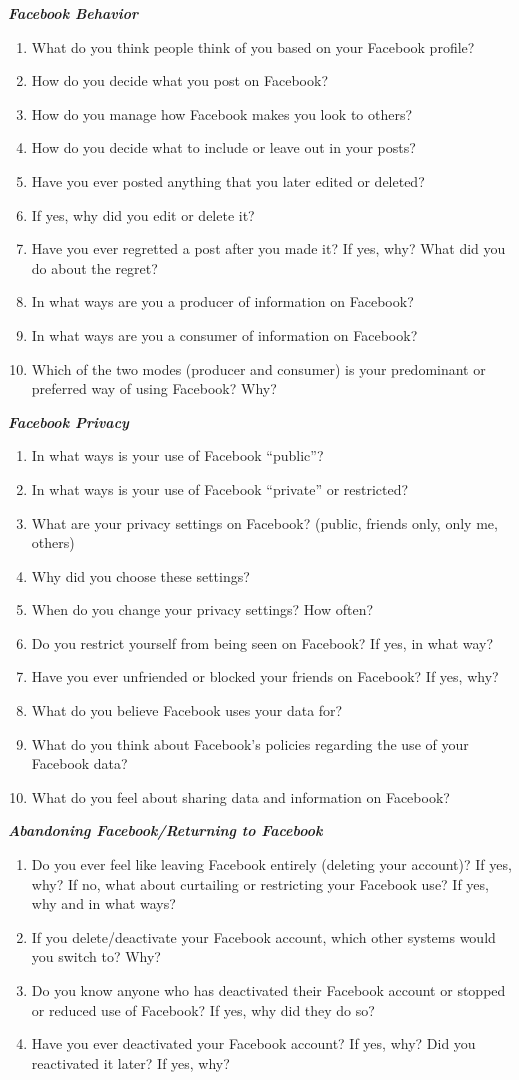 \textbf{\textit{Facebook Behavior}}
\begin{enumerate}
\item What do you think people think of you based on your Facebook profile?
\item How do you decide what you post on Facebook?
\item How do you manage how Facebook makes you look to others?
\item How do you decide what to include or leave out in your posts?
\item Have you ever posted anything that you later edited or deleted?
\item If yes, why did you edit or delete it?
\item Have you ever regretted a post after you made it? If yes, why? What did you do about the regret?
\item In what ways are you a producer of information on Facebook?
\item In what ways are you a consumer of information on Facebook?
\item Which of the two modes (producer and consumer) is your predominant or preferred way of using Facebook? Why? 
\end{enumerate}
\textbf{\textit{Facebook Privacy}}
\begin{enumerate}
\item In what ways is your use of Facebook “public”?
\item In what ways is your use of Facebook “private” or restricted?
\item What are your privacy settings on Facebook? (public, friends only, only me, others)
\item Why did you choose these settings?
\item When do you change your privacy settings? How often?
\item Do you restrict yourself from being seen on Facebook? If yes, in what way?
\item Have you ever unfriended or blocked your friends on Facebook? If yes, why?
\item What do you believe Facebook uses your data for?
\item What do you think about Facebook’s policies regarding the use of your Facebook data?
\item What do you feel about sharing data and information on Facebook?
\end{enumerate}
\textbf{\textit{Abandoning Facebook/Returning to Facebook}}
\begin{enumerate}
\item Do you ever feel like leaving Facebook entirely (deleting your account)? If yes, why? If no, what about curtailing or restricting your Facebook use? If yes, why and in what ways?
\item If you delete/deactivate your Facebook account, which other systems would you switch to? Why?
\item Do you know anyone who has deactivated their Facebook account or stopped or reduced use of Facebook? If yes, why did they do so?
\item Have you ever deactivated your Facebook account? If yes, why? Did you reactivated it later? If yes, why?
\end{enumerate}
